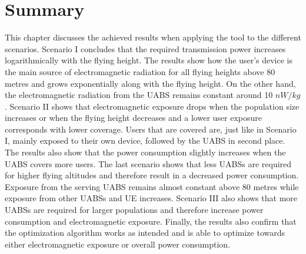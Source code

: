 \section{Summary}
This chapter discusses the achieved results when applying the tool to the different scenarios.
Scenario I concludes that the required transmission power increases logarithmically with the flying height.
The results show how the user's device is the main source of electromagnetic radiation 
for all flying heights above 80 metres and grows exponentially along with the flying height. 
On the other hand, the electromagnetic 
radiation from the \gls{UABS} remains constant around 10 $nW/kg$.
Scenario II shows that electromagnetic exposure  drops when the population size increases or when the flying height decreases
and a lower user exposure corresponds with lower coverage. Users that are covered are, just like in Scenario I, 
mainly exposed to their own device, followed by the \gls{UABS} in second place. The results also show that 
the power consumption slightly increases when the \gls{UABS} covers more users.
The last scenario shows that less \gls{UABS}s are required for higher flying altitudes and therefore 
result in a decreased power consumption.  Exposure from the serving \gls{UABS} remains almost constant above 80 metres while 
exposure from other \gls{UABS}s and \gls{UE} increases. Scenario III also shows that more \gls{UABS}s are 
required for larger populations and therefore increase power consumption and electromagnetic exposure.
Finally, the results also confirm that the optimization algorithm works as intended 
and is able to optimize towards either electromagnetic exposure or overall power consumption.


